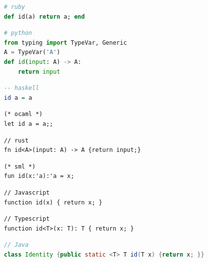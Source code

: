 \documentclass{beamer}
\begin{document}
\begin{frame}[fragile]
\begin{tiny}
\begin{lstlisting}[language=ruby]
# ruby
def id(a) return a; end
\end{lstlisting}
  \pause

\begin{lstlisting}[language=python]
# python
from typing import TypeVar, Generic
A = TypeVar('A')
def id(input: A) -> A:
    return input
\end{lstlisting}
  \pause

\begin{lstlisting}[language=haskell]
-- haskell
id a = a
\end{lstlisting}
  \pause

\begin{lstlisting}
(* ocaml *)
let id a = a;;
\end{lstlisting}
  \pause

\begin{lstlisting}
// rust
fn id<A>(input: A) -> A {return input;}
\end{lstlisting}
  \pause

\begin{lstlisting}
(* sml *)
fun id(x:'a):'a = x;
\end{lstlisting}
  \pause

\begin{lstlisting}
// Javascript
function id(x) { return x; }
\end{lstlisting}
  \pause

\begin{lstlisting}
// Typescript
function id<T>(x: T): T { return x; }
\end{lstlisting}
  \pause

\begin{lstlisting}[language=Java]
// Java
class Identity {public static <T> T id(T x) {return x; }}
\end{lstlisting}
  \end{tiny}
\end{frame}
\end{document}
